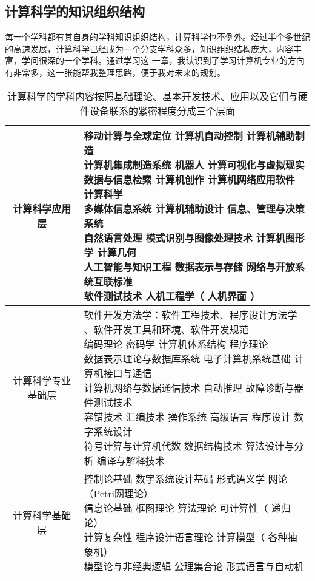 \documentclass{article}
\begin{document}
\subsection{计算科学的知识组织结构}
每一个学科都有其自身的学科知识组织结构，计算科学也不例外。经过半个多世纪的高速发展，计算科学已经成为一个分支学科众多，知识组织结构庞大，内容丰富，学问很深的一个学科。通过学习这 一章，我认识到了学习计算机专业的方向有非常多，这一张能帮我整理思路，便于我对未来的规划。
\par
\begin{table}[h]
    \centering
    \caption{计算科学的学科内容按照基础理论、基本开发技术、应用以及它们与硬件设备联系的紧密程度分成三个层面}
\begin{tabular}{c|l|}
    \hline
    计算科学应用层 & \makecell[l]{移动计算与全球定位 \quad 计算机自动控制 \quad 计算机辅助制造 \\ 计算机集成制造系统 \quad 机器人 \quad 计算可视化与虚拟现实 \\ 数据与信息检索 \quad 计算机创作 \quad 计算机网络应用软件 \quad 计算科学 \\ 多媒体信息系统 \quad 计算机辅助设计 \quad 信息、管理与决策系统 \\ 自然语言处理 \quad 模式识别与图像处理技术 \quad 计算机图形学 \quad 计算几何 \\ 人工智能与知识工程 \quad 数据表示与存储 \quad 网络与开放系统互联标准 \\ 软件测试技术 \quad 人机工程学（ 人机界面 ）}  \\
    \hline
    计算科学专业基础层 & \makecell[l]{软件开发方法学：软件工程技术、程序设计方法学\\、软件开发工具和环境、软件开发规范 \\ 编码理论 \quad 密码学 \quad 计算机体系结构 \quad 程序理论 \\ 数据表示理论与数据库系统 \quad 电子计算机系统基础 \quad 计算机接口与通信 \\ 计算机网络与数据通信技术 \quad 自动推理 \quad 故障诊断与器件测试技术 \\ 容错技术 \quad 汇编技术 \quad 操作系统 \quad 高级语言 \quad 程序设计 \quad 数字系统设计 \\ 符号计算与计算机代数 \quad 数据结构技术 \quad 算法设计与分析 \quad 编译与解释技术 } \\ 
    \hline
    计算科学基础层 & \makecell[l]{控制论基础 \quad 数字系统设计基础 \quad 形式语义学 \quad 网论（Petri网理论） \\ 信息论基础 \quad 框图理论 \quad 算法理论 \quad 可计算性（ 递归论） \\ 计算复杂性 \quad 程序设计语言理论 \quad 计算模型（ 各种抽象机） \\ 模型论与非经典逻辑 \quad 公理集合论 \quad 形式语言与自动机} \\

\end{tabular}
\end{table}
\end{document}
